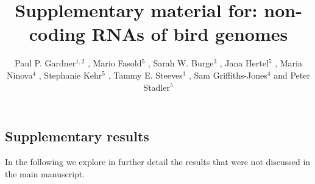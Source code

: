 \documentclass[10pt]{bmc_article}
\newenvironment{bmcformat}{\begin{raggedright}\baselineskip20pt\sloppy\setboolean{publ}{false}}{\end{raggedright}\baselineskip20pt\sloppy}
\begin{document}
\begin{bmcformat}

\title{Supplementary material for: non-coding RNAs of bird genomes}

\author{
Paul P. Gardner\correspondingauthor$^{1,2}$
,
Mario Fasold$^5$
,
Sarah W. Burge$^3$
,
Jana Hertel$^5$
,
Maria Ninova$^4$
,
Stephanie Kehr$^5$
,
Tammy E. Steeves$^1$
,
Sam Griffiths-Jones$^4$
and
Peter Stadler\correspondingauthor$^5$
}
\address{
\iid(1) School of Biological Sciences, University of Canterbury, Private Bag 4800, Christchurch, New Zealand.
\iid(2) Biomolecular Interaction Centre, University of Canterbury, Private Bag 4800, Christchurch, New Zealand.
\iid(3) European Molecular Biology Laboratory, European Bioinformatics Institute, Hinxton, Cambridge, CB10 1SD, UK.
\iid(4) Faculty of Life Sciences, University of Manchester, Manchester, United Kingdom.
\iid(5) Bioinformatics Group, Department of Computer Science; and Interdisciplinary Center for Bioinformatics, University of Leipzig, H{\"a}rtelstrasse 16-18, D-04107 Leipzig, Germany
}

\maketitle





\section*{Supplementary results}

In the following we explore in further detail the results that were
not discussed in the main manuscript. 


\end{bmcformat}
\end{document}

